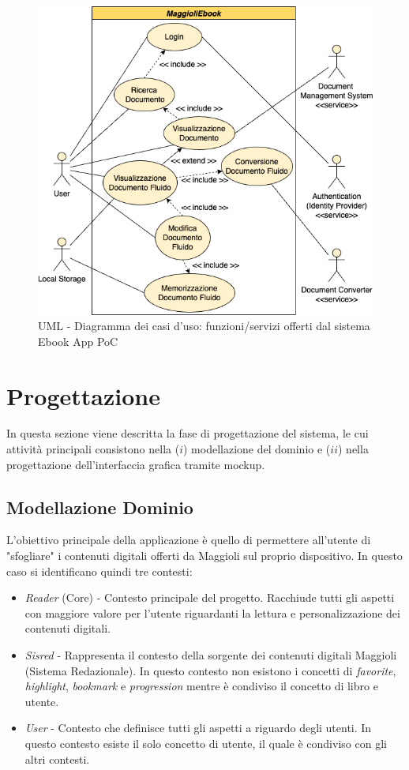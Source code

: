 \begin{figure}[H]
\centering
\includegraphics[width=1\textwidth]{img/tesi-1-Use-case.drawio.png}
\caption{UML - Diagramma dei casi d'uso: funzioni/servizi offerti dal sistema Ebook App PoC}
\end{figure}

\section{Progettazione}
In questa sezione viene descritta la fase di progettazione del sistema, le cui attività principali consistono nella ($i$) modellazione del dominio e ($ii$) nella progettazione dell'interfaccia grafica tramite mockup.

\subsection{Modellazione Dominio}

L'obiettivo principale della applicazione è quello di permettere all'utente di "sfogliare" i contenuti digitali offerti da Maggioli sul proprio dispositivo. In questo caso si identificano quindi tre contesti:

\begin{itemize}
    \item \textit{Reader} (Core) - Contesto principale del progetto. Racchiude tutti gli aspetti con maggiore valore per l'utente riguardanti la lettura e personalizzazione dei contenuti digitali. 
    \item \textit{Sisred} - Rappresenta il contesto della sorgente dei contenuti digitali Maggioli (Sistema Redazionale\cite{amslaurea23043}). In questo contesto non esistono i concetti di \textit{favorite}, \textit{highlight}, \textit{bookmark} e \textit{progression} mentre è condiviso il concetto di libro e utente.
    \item \textit{User} - Contesto che definisce tutti gli aspetti a riguardo degli utenti. In questo contesto esiste il solo concetto di utente, il quale è condiviso con gli altri contesti.
\end{itemize}

